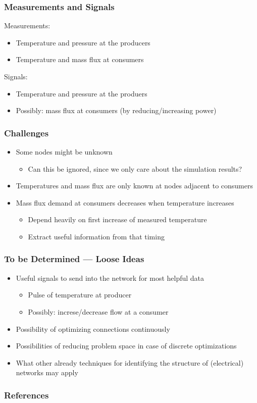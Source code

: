 \documentclass{beamer}
\begin{document}
\begin{frame}
\frametitle{Measurements and Signals}
  Measurements:
  \begin{itemize}
    \item Temperature and pressure at the producers
    \item Temperature and mass flux at consumers
  \end{itemize}

  \vspace{2em}

  Signals:
  \begin{itemize}
    \item Temperature and pressure at the produers
    \item Possibly: mass flux at consumers (by reducing/increasing power)
  \end{itemize}
\end{frame}

\begin{frame}
\frametitle{Challenges}
  \begin{itemize}
    \item Some nodes might be unknown
      \begin{itemize}
        \item Can this be ignored, since we only care about the simulation results?
      \end{itemize}
    \item Temperatures and mass flux are only known at nodes adjacent to consumers
    \item Mass flux demand at consumers decreases when temperature increases
      \begin{itemize}
        \item Depend heavily on first increase of measured temperature
        \item Extract useful information from that timing
      \end{itemize}
  \end{itemize}
\end{frame}

\begin{frame}
\frametitle{To be Determined --- Loose Ideas}
  \begin{itemize}
    \item Useful signals to send into the network for most helpful data
      \begin{itemize}
        \item Pulse of temperature at producer
        \item Possibly: increse/decrease flow at a consumer
      \end{itemize}
    \item Possibility of optimizing connections continuously
    \item Possibilities of reducing problem space in case of discrete optimizations
      \vspace{1em}
    \item What other already techniques for identifying the structure of (electrical) networks may apply
  \end{itemize}
\end{frame}

\begin{frame}
\frametitle{References}
  \printbibliography
\end{frame}
\end{document}
